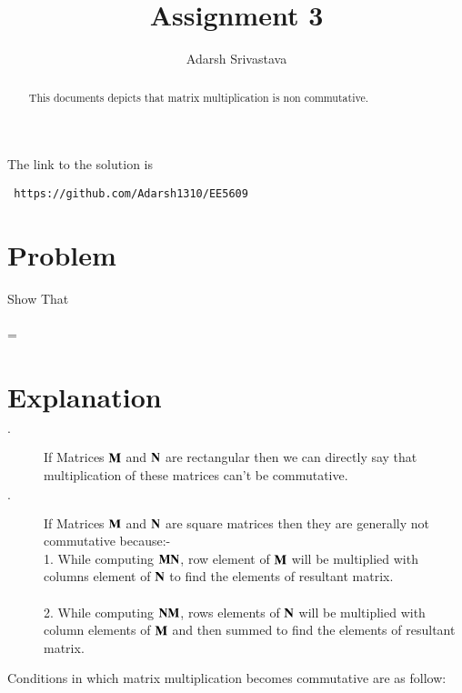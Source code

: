 \documentclass[journal,12pt,twocolumn]{IEEEtran}
\begin{document}
     \def\rightbox#1{\makebox[0in][r]{#1}}
     \def\centbox#1{\makebox[0in]{#1}}
     \def\topbox#1{\raisebox{-\baselineskip}[0in][0in]{#1}}
     \def\midbox#1{\raisebox{-0.5\baselineskip}[0in][0in]{#1}}
\vspace{3cm}
\title{Assignment 3}
\author{Adarsh Srivastava}
\maketitle
\newpage
\bigskip
\renewcommand{\thetable}{\theenumi}
The link to the solution is
\begin{lstlisting}
 https://github.com/Adarsh1310/EE5609
\end{lstlisting}
\begin{abstract}
This documents depicts that matrix multiplication is non commutative.
\end{abstract}
\section{\textbf{Problem}}
Show That\\
\\
 \not=

\section{\textbf{Explanation}}
\begin{description}
\item[$\cdot$ ]
If Matrices $\bf{M}$ and $\bf{N}$ are rectangular then we can directly say that multiplication of these matrices can't be commutative.\\
\item[$\cdot$]
If Matrices $\bf{M}$ and $\bf{N}$ are square matrices then they are generally not commutative because:-\\

1. While computing $\bf{MN}$, row element of $\bf{M}$ will be multiplied with columns element of $\bf{N}$ to find the elements of resultant matrix.\\
\\
2. While computing $\bf{NM}$, rows elements of $\bf{N}$ will be multiplied with column elements of $\bf{M}$ and then summed to find the elements of resultant matrix.\\
\end{description}
Conditions in which matrix multiplication becomes commutative are as follow:
\\
\end{document}
